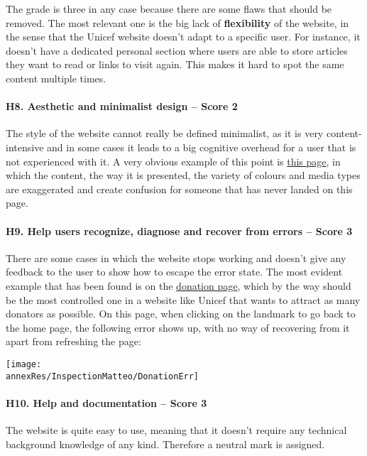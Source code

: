 The grade is three in any case because there are some flaws that should be removed. The most relevant one is the big lack of \textbf{flexibility} of the website, in the sense that the Unicef website doesn't adapt to a specific user. For instance, it doesn't have a dedicated personal section where users are able to store articles they want to read or links to visit again. This makes it hard to spot the same content multiple times.




\paragraph*{H8. Aesthetic and minimalist design – Score 2}
The style of the website cannot really be defined minimalist, as it is very content-intensive and in some cases it leads to a big cognitive overhead for a user that is not experienced with it. A very obvious example of this point is \href{https://www.unicef.org/reports/state-worlds-children-2023#SOWC}{this page}, in which the content, the way it is presented, the variety of colours and media types are exaggerated and create confusion for someone that has never landed on this page.

\paragraph*{H9. Help users recognize, diagnose and recover from errors – Score 3}
There are some cases in which the website stops working and doesn't give any feedback to the user to show how to escape the error state. The most evident example that has been found is on the \href{https://donazioni.unicef.it/landing/2021/07/donazioni_home/#}{donation page}, which by the way should be the most controlled one in a website like Unicef that wants to attract as many donators as possible. 
On this page, when clicking on the landmark to go back to the home page, the following error shows up, with no way of recovering from it apart from refreshing the page:

\begin{center}
	\texttt{[image: \\annexRes/InspectionMatteo/DonationErr]}
	
\end{center}


\paragraph*{H10. Help and documentation – Score 3}
The website is quite easy to use, meaning that it doesn't require any technical background knowledge of any kind. Therefore a neutral mark is assigned.


